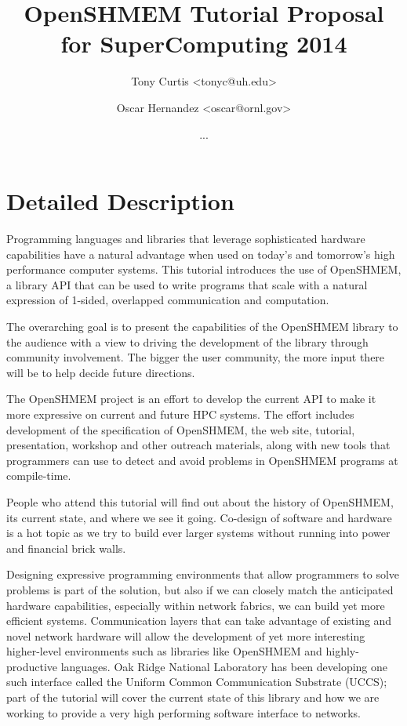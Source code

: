 \documentclass[10pt,english]{article}
\begin{document}
\title{OpenSHMEM Tutorial Proposal for SuperComputing 2014}
\author{Tony Curtis <tonyc@uh.edu> \and Oscar Hernandez <oscar@ornl.gov> \and ...}

\maketitle

\section{Detailed Description}

Programming languages and libraries that leverage sophisticated
hardware capabilities have a natural advantage when used on today's
and tomorrow's high performance computer systems.  This tutorial
introduces the use of OpenSHMEM, a library API that can be used to
write programs that scale with a natural expression of 1-sided,
overlapped communication and computation.

The overarching goal is to present the capabilities of the OpenSHMEM
library to the audience with a view to driving the development of the
library through community involvement.  The bigger the user community,
the more input there will be to help decide future directions.

The OpenSHMEM project is an effort to develop the current API to make
it more expressive on current and future HPC systems.  The effort
includes development of the specification of OpenSHMEM, the web site,
tutorial, presentation, workshop and other outreach materials, along
with new tools that programmers can use to detect and avoid problems
in OpenSHMEM programs at compile-time.

People who attend this tutorial will find out about the history of
OpenSHMEM, its current state, and where we see it going.  Co-design of
software and hardware is a hot topic as we try to build ever larger
systems without running into power and financial brick walls.

Designing expressive programming environments that allow programmers
to solve problems is part of the solution, but also if we can closely
match the anticipated hardware capabilities, especially within network
fabrics, we can build yet more efficient systems.  Communication
layers that can take advantage of existing and novel network hardware
will allow the development of yet more interesting higher-level
environments such as libraries like OpenSHMEM and highly-productive
languages.  Oak Ridge National Laboratory has been developing one such
interface called the Uniform Common Communication Substrate (UCCS);
part of the tutorial will cover the current state of this library and
how we are working to provide a very high performing software
interface to networks.
\end{document}
